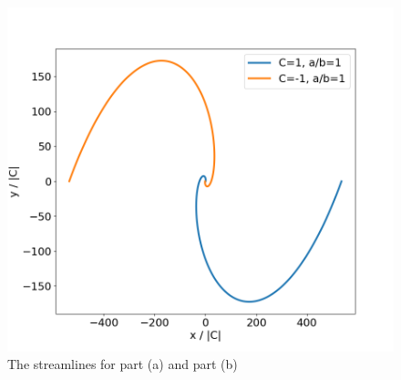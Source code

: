 \documentclass[11pt]{article}
\begin{document}
\begin{figure}[htbp]
\centering
\includegraphics[width=.9\linewidth]{../plots/spiral.png}
\caption{\label{fig:spiral}The streamlines for part (a) and part (b)}
\end{figure}
\end{document}
